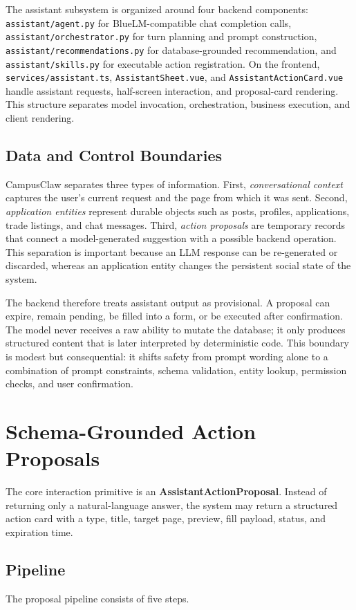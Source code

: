 \documentclass[sigconf]{acmart}
\begin{document}
The assistant subsystem is organized around four backend components: \texttt{assistant/agent.py} for BlueLM-compatible chat completion calls, \texttt{assistant/orchestrator.py} for turn planning and prompt construction, \texttt{assistant/recommendations.py} for database-grounded recommendation, and \texttt{assistant/skills.py} for executable action registration. On the frontend, \texttt{services/assistant.ts}, \texttt{AssistantSheet.vue}, and \texttt{AssistantActionCard.vue} handle assistant requests, half-screen interaction, and proposal-card rendering. This structure separates model invocation, orchestration, business execution, and client rendering.

\subsection{Data and Control Boundaries}
CampusClaw separates three types of information. First, \emph{conversational context} captures the user's current request and the page from which it was sent. Second, \emph{application entities} represent durable objects such as posts, profiles, applications, trade listings, and chat messages. Third, \emph{action proposals} are temporary records that connect a model-generated suggestion with a possible backend operation. This separation is important because an LLM response can be re-generated or discarded, whereas an application entity changes the persistent social state of the system.

The backend therefore treats assistant output as provisional. A proposal can expire, remain pending, be filled into a form, or be executed after confirmation. The model never receives a raw ability to mutate the database; it only produces structured content that is later interpreted by deterministic code. This boundary is modest but consequential: it shifts safety from prompt wording alone to a combination of prompt constraints, schema validation, entity lookup, permission checks, and user confirmation.

\section{Schema-Grounded Action Proposals}
The core interaction primitive is an \textbf{AssistantActionProposal}. Instead of returning only a natural-language answer, the system may return a structured action card with a type, title, target page, preview, fill payload, status, and expiration time.

\subsection{Pipeline}
The proposal pipeline consists of five steps.
\end{document}
